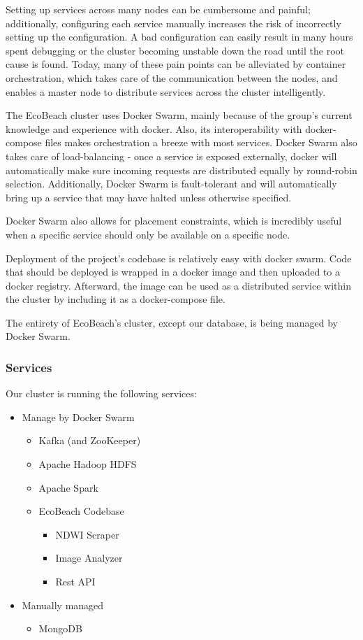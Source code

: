 Setting up services across many nodes can be cumbersome and painful; additionally, configuring each service manually increases the risk of incorrectly setting up the configuration. A bad configuration can easily result in many hours spent debugging or the cluster becoming unstable down the road until the root cause is found. 
Today, many of these pain points can be alleviated by container orchestration, which takes care of the communication between the nodes, and enables a master node to distribute services across the cluster intelligently. 


The EcoBeach cluster uses Docker Swarm, mainly because of the group's current knowledge and experience with docker. Also, its interoperability with docker-compose files makes orchestration a breeze with most services. Docker Swarm also takes care of load-balancing - once a service is exposed externally, docker will automatically make sure incoming requests are distributed equally by round-robin selection. Additionally, Docker Swarm is fault-tolerant and will automatically bring up a service that may have halted unless otherwise specified. 

Docker Swarm also allows for placement constraints, which is incredibly useful when a specific service should only be available on a specific node.

Deployment of the project's codebase is relatively easy with docker swarm. Code that should be deployed is wrapped in a docker image and then uploaded to a docker registry. Afterward, the image can be used as a distributed service within the cluster by including it as a docker-compose file. 

The entirety of EcoBeach's cluster, except our database, is being managed by Docker Swarm. 

\subsubsection*{Services}

Our cluster is running the following services:

\begin{itemize}
    \item Manage by Docker Swarm
    \begin{itemize}
        \item Kafka (and ZooKeeper)
        \item Apache Hadoop HDFS
        \item Apache Spark
        \item EcoBeach Codebase
        \begin{itemize}
            \item NDWI Scraper
            \item Image Analyzer
            \item Rest API
        \end{itemize}
    \end{itemize}
    \item Manually managed
    \begin{itemize}
        \item MongoDB
    \end{itemize}
\end{itemize}


